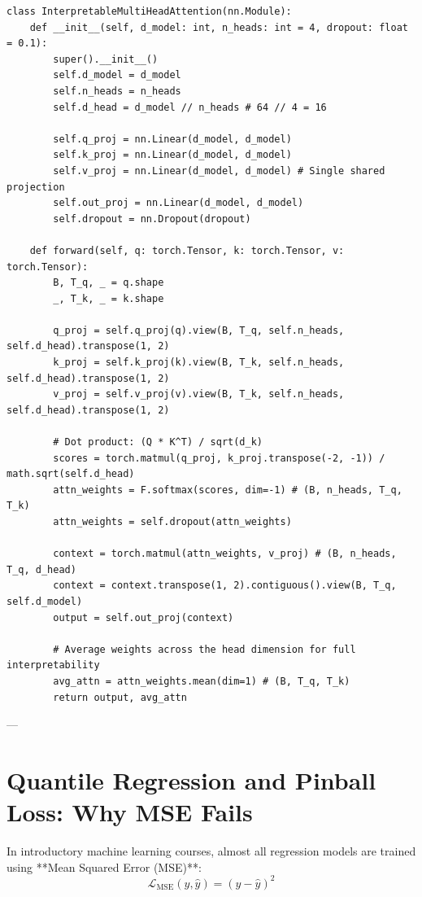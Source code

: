 \documentclass[11pt,a4paper]{article}
\begin{document}
\begin{codebox}
\begin{lstlisting}
class InterpretableMultiHeadAttention(nn.Module):
    def __init__(self, d_model: int, n_heads: int = 4, dropout: float = 0.1):
        super().__init__()
        self.d_model = d_model
        self.n_heads = n_heads
        self.d_head = d_model // n_heads # 64 // 4 = 16

        self.q_proj = nn.Linear(d_model, d_model)
        self.k_proj = nn.Linear(d_model, d_model)
        self.v_proj = nn.Linear(d_model, d_model) # Single shared projection
        self.out_proj = nn.Linear(d_model, d_model)
        self.dropout = nn.Dropout(dropout)

    def forward(self, q: torch.Tensor, k: torch.Tensor, v: torch.Tensor):
        B, T_q, _ = q.shape
        _, T_k, _ = k.shape

        q_proj = self.q_proj(q).view(B, T_q, self.n_heads, self.d_head).transpose(1, 2)
        k_proj = self.k_proj(k).view(B, T_k, self.n_heads, self.d_head).transpose(1, 2)
        v_proj = self.v_proj(v).view(B, T_k, self.n_heads, self.d_head).transpose(1, 2)

        # Dot product: (Q * K^T) / sqrt(d_k)
        scores = torch.matmul(q_proj, k_proj.transpose(-2, -1)) / math.sqrt(self.d_head)
        attn_weights = F.softmax(scores, dim=-1) # (B, n_heads, T_q, T_k)
        attn_weights = self.dropout(attn_weights)

        context = torch.matmul(attn_weights, v_proj) # (B, n_heads, T_q, d_head)
        context = context.transpose(1, 2).contiguous().view(B, T_q, self.d_model)
        output = self.out_proj(context)

        # Average weights across the head dimension for full interpretability
        avg_attn = attn_weights.mean(dim=1) # (B, T_q, T_k)
        return output, avg_attn
\end{lstlisting}
\end{codebox}

---

\section{Quantile Regression and Pinball Loss: Why MSE Fails}

In introductory machine learning courses, almost all regression models are trained using **Mean Squared Error (MSE)**:
\begin{equation}
    \mathcal{L}_{\text{MSE}}(y, \hat{y}) = (y - \hat{y})^2
\end{equation}
\end{document}
